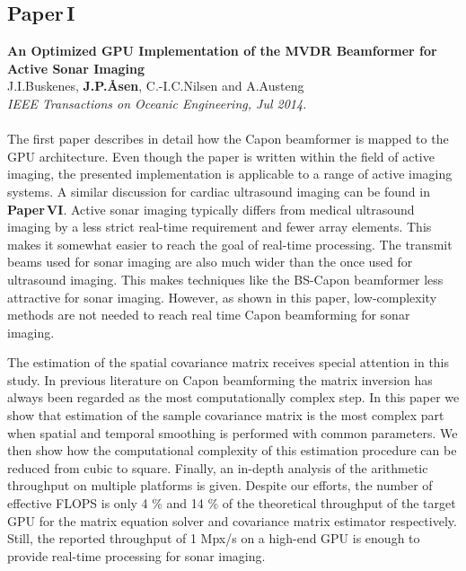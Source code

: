 \subsection{Paper\,I}
\textbf{An Optimized GPU Implementation of the MVDR Beamformer for Active Sonar Imaging}\\
J.\:I.\:Buskenes, \textbf{J.\:P.\:\AA{}sen}, C.-I.\:C.\:Nilsen and A.\:Austeng\\
{\it IEEE Transactions on Oceanic Engineering, Jul 2014.}\\\\
The first paper describes in detail how the Capon beamformer is mapped to the GPU architecture. Even though the paper is written within the field of active  imaging, the presented implementation is applicable to a range of active imaging systems. A similar discussion for cardiac ultrasound imaging can be found in \textbf{Paper\,VI}.  Active sonar imaging typically differs from medical ultrasound imaging by a less strict real-time requirement and fewer array elements. This makes it somewhat easier to reach the goal of real-time processing. The transmit beams used for sonar imaging are also much wider than the once used for ultrasound imaging. This makes techniques like the BS-Capon beamformer less attractive for sonar imaging. However, as shown in this paper, low-complexity methods are not needed to reach real time Capon beamforming for sonar imaging.

The estimation of the spatial covariance matrix receives special attention in this study. In previous literature on Capon beamforming the matrix inversion has always been regarded as the most computationally complex step. In this paper we show that estimation of the sample covariance matrix is the most complex part when spatial and temporal smoothing is performed with common parameters. We then show how the computational complexity of this estimation procedure can be reduced from cubic to square. Finally, an in-depth analysis of the arithmetic throughput on multiple platforms is given. Despite our efforts, the number of effective FLOPS is only 4 \% and 14 \% of the theoretical throughput of the target GPU for the matrix equation solver and covariance matrix estimator respectively. Still, the reported throughput of 1 Mpx/s on a high-end GPU is enough to provide real-time processing for sonar imaging.

